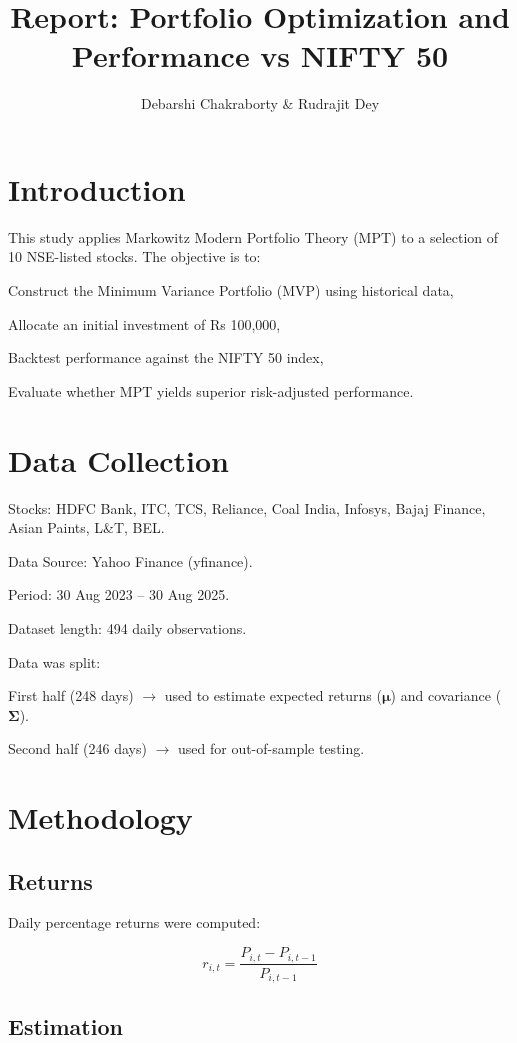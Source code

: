 \documentclass[12pt]{article}
\title{Report: Portfolio Optimization and Performance vs NIFTY 50}
\author{Debarshi Chakraborty \& Rudrajit Dey}
\begin{document}
\maketitle

\section{Introduction}

This study applies Markowitz Modern Portfolio Theory (MPT) to a selection of 10 NSE-listed stocks.
The objective is to:

Construct the Minimum Variance Portfolio (MVP) using historical data,

Allocate an initial investment of Rs 100,000,

Backtest performance against the NIFTY 50 index,

Evaluate whether MPT yields superior risk-adjusted performance.

\section{Data Collection}

Stocks: HDFC Bank, ITC, TCS, Reliance, Coal India, Infosys, Bajaj Finance, Asian Paints, L\&T, BEL.

Data Source: Yahoo Finance (yfinance).

Period: 30 Aug 2023 – 30 Aug 2025.

Dataset length: 494 daily observations.

Data was split:

First half (248 days) $\rightarrow$ used to estimate expected returns ($\boldsymbol{\mu}$) and covariance ($\boldsymbol{\Sigma}$).

Second half (246 days) $\rightarrow$ used for out-of-sample testing.

\section{Methodology}
\subsection{Returns}

Daily percentage returns were computed:

\[
r_{i,t} = \frac{P_{i,t} - P_{i,t-1}}{P_{i,t-1}}
\]

\subsection{Estimation}
\end{document}
